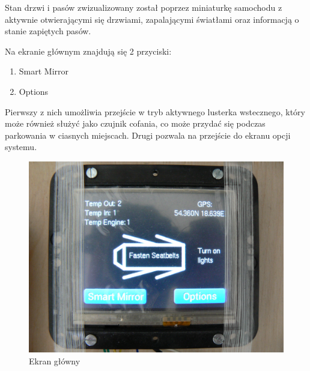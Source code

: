 \documentclass{xmgr}
\begin{document}
Stan drzwi i pasów zwizualizowany został poprzez miniaturkę samochodu z aktywnie otwierającymi się drzwiami, zapalającymi światłami oraz informacją o stanie zapiętych pasów.

Na ekranie głównym znajdują się 2 przyciski:
\begin{enumerate}
	\item Smart Mirror
	\item Options
\end{enumerate}

Pierwszy z nich umożliwia przejście w tryb aktywnego lusterka wstecznego, który może również służyć jako czujnik cofania, co może przydać się podczas parkowania w ciasnych miejscach. Drugi pozwala na przejście do ekranu opcji systemu. 

\begin{figure}[!h]
    \centering
    	\includegraphics[height=0.4\textheight]{images/mainScreen.JPG}
    \caption{Ekran główny}
\end{figure}
\end{document}
